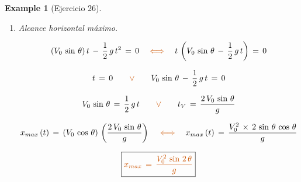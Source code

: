 \documentclass[a4paper,11pt,openany]{book}
\newtheorem{exmp}{Example}[section]
\newcommand*{\itembolasazules}[1]{%
\footnotesize\protect\tikz[baseline=-3pt]%
\protect\node[scale=.7, circle, shade, ball
color=green]{\color{white}\Large\bf#1};}
\begin{document}
\begin{exmp}[Ejercicio 26]
\begin{enumerate}[label=\itembolasazules{\arabic*}]
$$\mathcal{L}^{-\,1}\,\left(Y \right)\,=\,V_{0}\,\sin\,\theta\,\mathcal{L}^{-\,1}\,\left(\dfrac{1}{S^{2}} \right)\,-\,\dfrac{1}{\textcolor{burntorange}{2}}\,g\,\mathcal{L}^{-\,1}\,\left(\dfrac{\textcolor{burntorange}{2} }{S^{3}} \right)$$
 
$$\boxed{\textcolor{burntorange}{y\,(t)\,=\,(V_{0}\,\sin\,\theta)\,t\,-\,\dfrac{1}{2}\,g\,t^{2} } } $$
 
\item Alcance horizontal máximo.
 
$$(V_{0}\,\sin\,\theta)\,t\,-\,\dfrac{1}{2}\,g\,t^{2}\,=\,0 \quad \textcolor{burntorange}{\iff} \quad t\,\left(V_{0}\,\sin\,\theta\,-\,\dfrac{1}{2}\,g\,t \right)\,=\,0$$
 
$$t\,=\,0 \qquad \textcolor{burntorange}{\vee} \qquad V_{0}\,\sin\,\theta\,-\,\dfrac{1}{2}\,g\,t\,=\,0$$
 
$$V_{0}\,\sin\,\theta\,=\,\dfrac{1}{2}\,g\,t \qquad \textcolor{burntorange}{\vee} \qquad t_{V}\,=\,\dfrac{2\,V_{0}\,\sin\,\theta}{g}$$
 
\textcolor{burntorange}{ } $$x_{max}\,(t)\,=\,(V_{0}\,\cos\,\theta)\,\left(\dfrac{2\,V_{0}\,\sin\,\theta}{g} \right) \quad \textcolor{burntorange}{\iff} \quad x_{max}\,(t)\,=\,\dfrac{V_{0}^{2}\,\times\,2\,\sin\,\theta\,\cos\,\theta }{g}$$
 
$$\boxed{\textcolor{burntorange}{x_{max}\,=\,\dfrac{V_{0}^{2}\,\sin\,2\,\theta }{g} }} $$
 
\end{enumerate}
 
\end{exmp}
 
\end{document}
